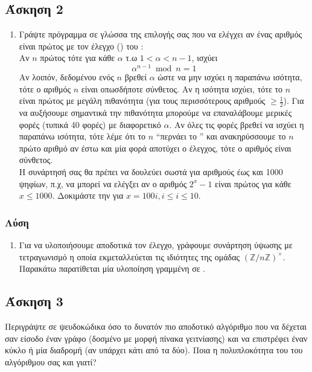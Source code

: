 \documentclass{assignment}
\begin{document}
\newpage\subsection*{Άσκηση 2}
\begin{enumerate}
\item
Γράψτε πρόγραμμα σε γλώσσα της επιλογής σας που να ελέγχει αν ένας αριθμός
είναι πρώτος με τον έλεγχο () του :\\
Αν $n$ πρώτος τότε για κάθε $\alpha$ τ.ω $1 < \alpha < n -1$, ισχύει
\begin{equation*} \alpha^{n-1} \bmod n = 1 \end{equation*}
Αν λοιπόν, δεδομένου ενός $n$ βρεθεί $\alpha$ ώστε να μην ισχύει η παραπάνω
ισότητα, τότε ο αριθμός $n$ είναι οπωσδήποτε σύνθετος. Αν η ισότητα ισχύει,
τότε το $n$ είναι πρώτος με μεγάλη πιθανότητα (για τους περισσότερους αριθμούς
$\ge \frac{1}{2}$). Για να αυξήσουμε σημαντικά την πιθανότητα μπορούμε να 
επαναλάβουμε μερικές φορές (τυπικά 40 φορές) με διαφορετικό $\alpha$. Αν όλες
τις φορές βρεθεί να ισχύει η παραπάνω ισότητα, τότε λέμε ότι το $n$ 
``περνάει το '' και ανακηρύσσουμε το $n$ πρώτο αριθμό αν
έστω και μία φορά αποτύχει ο έλεγχος, τότε ο αριθμός είναι σύνθετος.\\
Η συνάρτησή σας θα πρέπει να δουλεύει σωστά για αριθμούς έως και 1000 ψηφίων,
π.χ, να μπορεί να ελέγξει αν ο αριθμός $2^x-1$ είναι πρώτος για κάθε 
$x \le 1000$. Δοκιμάστε την για $x=100i, i \le i \le 10$. 
\end{enumerate}

\subsubsection*{Λύση}

\begin{enumerate}
\item
Για να υλοποιήσουμε αποδοτικά τον έλεγχο, γράφουμε συνάρτηση
ύψωσης με τετραγωνισμό η οποία εκμεταλλεύεται τις ιδιότητες της
ομάδας $(\mathbb{Z}/n\mathbb{Z})^{\times}$. Παρακάτω παρατίθεται 
μία υλοποίηση γραμμένη σε .


\end{enumerate}

\newpage\subsection*{Άσκηση 3}
Περιγράψτε σε ψευδοκώδικα όσο το δυνατόν πιο αποδοτικό αλγόριθμο που να δέχεται
σαν είσοδο έναν γράφο (δοσμένο με μορφή πίνακα γειτνίασης) και να επιστρέφει 
έναν κύκλο  ή μία διαδρομή  (αν υπάρχει κάτι από τα δύο).
Ποια η πολυπλοκότητα του του αλγόριθμου σας και γιατί?
\end{document}
